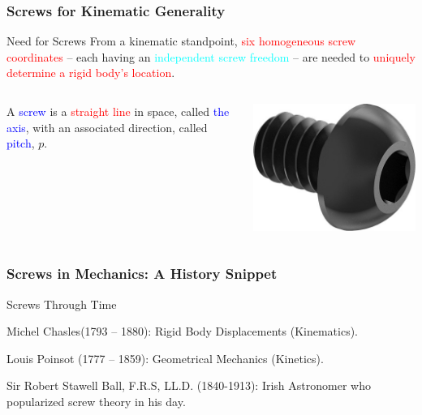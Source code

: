 \begin{frame}
	\frametitle{Screws for Kinematic Generality}
	\begin{block}{Need for Screws}
		From a kinematic standpoint, \textcolor{red}{six homogeneous screw coordinates} -- each having an \textcolor{cyan}{independent screw freedom} -- are needed to \textcolor{red}{uniquely determine a rigid body's location}.
	\end{block}
	\begin{columns}[b]
		\begin{column}{.7\columnwidth}
			\begin{definition}
				A \textcolor{blue}{screw} is a \textcolor{red}{straight line} in space, called \textcolor{blue}{the axis}, with an associated direction, called \textcolor{blue}{pitch}, $p$.
			\end{definition}
		\end{column}
		\begin{column}{.25\columnwidth}
			\centering
			\includegraphics[width=\textwidth]{figures/screw.jpg}
		\end{column}
	\end{columns}
\end{frame}

\begin{frame}
	\frametitle{Screws in Mechanics: A History Snippet}
	\begin{block}{Screws Through Time}
		\begin{description}
			\item Michel Chasles(1793 – 1880): Rigid Body Displacements (Kinematics).
			\item Louis Poinsot (1777 – 1859): Geometrical Mechanics (Kinetics).
			\item Sir Robert Stawell Ball, F.R.S, LL.D. (1840-1913): Irish Astronomer who popularized screw theory in his day.
		\end{description}
	\end{block}
\end{frame}

